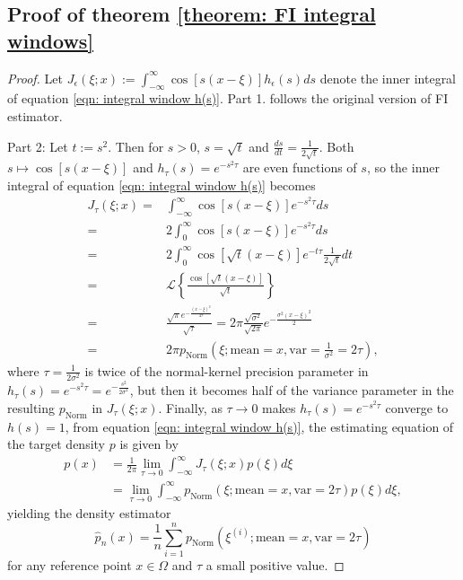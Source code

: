 \documentclass[%
 reprint,
 amsmath,amssymb,
 aps,
]{revtex4-2}
\begin{document}
\subsection{Proof of theorem \ref{theorem: FI integral windows}}
\begin{proof}
    Let $\displaystyle J_\epsilon(\xi; x) := \int_{-\infty}^\infty \cos[s(x-\xi)]h_\epsilon(s)ds$ denote the inner integral of equation \eqref{eqn: integral window h(s)}. Part 1. follows the original version of FI estimator.

    Part 2: Let $t := s^2$. Then for $s > 0$, $s = \sqrt{t}$ and $\frac{ds}{dt} = \frac{1}{2\sqrt{t}}$. Both $s \mapsto \cos[s(x - \xi)]$ and $\displaystyle h_\tau(s) = e^{-s^2\tau}$ are even functions of $s$, so the inner integral of equation \eqref{eqn: integral window h(s)} becomes
    \begin{align*}
        J_\tau(\xi; x) = & \int_{-\infty}^\infty \cos[s(x - \xi)]e^{-s^2\tau}ds \\
        = & 2\int_0^\infty \cos[s(x - \xi)]e^{-s^2\tau}ds \\
        = & 2\int_0^\infty \cos[\sqrt{t}(x - \xi)]e^{-t\tau}\frac{1}{2\sqrt{t}}dt \\
        = & \mathcal{L}\left\{\frac{\cos[\sqrt{t}(x - \xi)]}{\sqrt{t}} \right\} \\
        = & \frac{\sqrt{\pi}e^{-\frac{(x - \xi)^2}{4\tau}}}{\sqrt{\tau}} = 2\pi\frac{\sqrt{\sigma^2}}{\sqrt{2\pi}}e^{-\frac{\sigma^2(x - \xi)^2}{2}} \\
        = & 2\pi p_\text{Norm}(\xi; \text{mean} = x, \text{var} = \frac{1}{\sigma^2} = 2\tau),
    \end{align*}
    where $\tau = \frac{1}{2\sigma^2}$ is twice of the normal-kernel precision parameter in $\displaystyle h_\tau(s) = e^{-s^2\tau} = e^{-\frac{s^2}{2\sigma^2}}$, but then it becomes half of the variance parameter in the resulting $p_\text{Norm}$ in $J_\tau(\xi; x)$. Finally, as $\tau \to 0$ makes $\displaystyle h_\tau(s) = e^{-s^2\tau}$ converge to $h(s) = 1$, from equation \eqref{eqn: integral window h(s)}, the estimating equation of the target density $p$ is given by
    \begin{align*}
        p(x) & = \frac{1}{2\pi} \lim_{\tau \to 0} \int_{-\infty}^\infty J_\tau(\xi; x) p(\xi)d\xi \\
        & = \lim_{\tau \to 0} \int_{-\infty}^\infty p_\text{Norm}(\xi; \text{mean} = x, \text{var} = 2\tau) p(\xi)d\xi,
    \end{align*}
    yielding the density estimator
    \begin{equation*}
        \hat{p}_n(x) = \frac{1}{n} \sum_{i = 1}^n p_\text{Norm}(\xi^{(i)}; \text{mean} = x, \text{var} = 2\tau)
    \end{equation*}
    for any reference point $x \in \Omega$ and $\tau$ a small positive value.


\end{proof}
\end{document}
